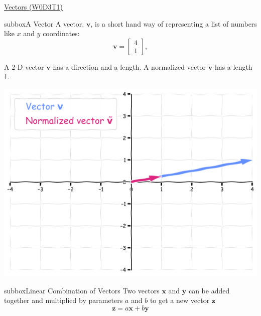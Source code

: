 \begin{multicols}{3}
\begin{textbox}{\href{https://compneuro.neuromatch.io/tutorials/W0D3_LinearAlgebra/student/W0D3_Tutorial1.html}{Vectors (W0D3T1) }}
\begin{subbox}{subbox}{A Vector}
\scriptsize
A vector, $\mathbf{v}$, is a short hand way of representing a list of numbers like $x$ and $y$ coordinates:
\begin{equation}
\mathbf{v} = 
\begin{bmatrix}
4 \\
1
\end{bmatrix},
\end{equation}

A 2-D vector $\mathbf{v}$ has a direction and a length. A normalized vector $\widetilde{\mathbf{v}}$ has a length 1.

\centering
\includegraphics[scale=0.1]{Figures/PreCourse/Figure1.png}
\end{subbox}

\begin{subbox}{subbox}{Linear Combination of Vectors}
\scriptsize
Two vectors $\mathbf{x}$ and $\mathbf{y}$ can be added together and multiplied by parameters $a$ and $b$ to get a new vector $\mathbf{z}$
\begin{equation}
\mathbf{z} = a\mathbf{x} + b\mathbf{y}
\end{equation}


\end{subbox}
\end{textbox}
\end{multicols}
